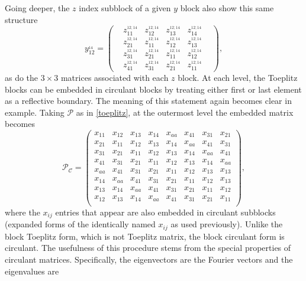 \documentclass[reprint,aps,prb]{revtex4-2}
\begin{document}
Going deeper, the $z$ index subblock of a given $y$ block also show this same structure
\begin{equation}
  	y^{_{14}}_{12}= 
  	\begin{pmatrix}
  	&z^{_{12;14}}_{11} &z^{_{12;14}}_{12} &z^{_{12;14}}_{13} &z^{_{12;14}}_{14}\;\;\;\\
 	&z^{_{12;14}}_{21} &z^{_{12;14}}_{11} &z^{_{12;14}}_{12} &z^{_{12;14}}_{13}\;\;\;\\
 	&z^{_{12;14}}_{31} &z^{_{12;14}}_{21}&z^{_{12;14}}_{11} &z^{_{12;14}}_{12}\;\;\\
 	&z^{_{12;14}}_{41} &z^{_{12;14}}_{31} &z^{_{12;14}}_{21} &z^{_{12;14}}_{11}\;\;\;
	\end{pmatrix},\nonumber
\end{equation}  
as do the $3\times 3$ matrices associated with each $z$ block. At each level, the Toeplitz blocks  can be embedded in circulant blocks by treating either first or last element as a reflective boundary. The meaning of this statement again becomes clear in example. Taking $\mathcal{P}$ as in \eqref{toeplitz}, at the outermost level the embedded matrix becomes
\begin{equation}
 	\mathcal{P}_\mathcal{C}=\left(
 	\begin{array}{cccc|cccc}
 	x_{11} &x_{12} &x_{13} &x_{14} &x_{aa} &x_{41} &x_{31} &x_{21} \\
 	x_{21} &x_{11} &x_{12} &x_{13} &x_{14} &x_{aa} &x_{41} &x_{31} \\
 	x_{31} &x_{21} &x_{11} &x_{12} &x_{13} &x_{14} &x_{aa} &x_{41} \\
 	x_{41} &x_{31} &x_{21} &x_{11} &x_{12} &x_{13} &x_{14} &x_{aa} \\
 	\hline 
 	x_{aa} &x_{41} &x_{31} &x_{21} &x_{11} &x_{12} &x_{13} &x_{13} \\
 	x_{14} &x_{aa} &x_{41} &x_{31} &x_{21} &x_{11} &x_{12} &x_{13} \\
	x_{13} &x_{14} &x_{aa} &x_{41} &x_{31} &x_{21} &x_{11} &x_{12} \\
	x_{12} &x_{13} &x_{14} &x_{aa} &x_{41} &x_{31} &x_{21} &x_{11} \\
	\end{array}\right),
	\label{circulant}
\end{equation} 
where the $x_{ij}$ entries that appear are also embedded in circulant subblocks (expanded forms of the identically named $x_{ij}$ as used previously). Unlike the block Toeplitz form, which is not Toeplitz matrix, the block circulant form is circulant. The usefulness of this procedure stems from the special properties of circulant matrices. Specifically, the eigenvectors are the Fourier vectors and the eigenvalues are
\end{document}
